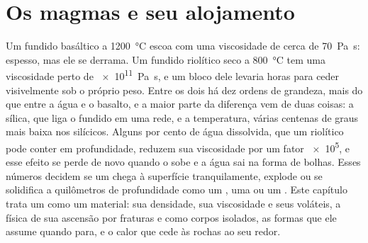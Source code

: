 \chapter{Os magmas e seu alojamento}\label{ch:b2:magma-emplacement}

Um fundido basáltico a \qty{1200}{\celsius} escoa com uma viscosidade de cerca de
\qty{70}{Pa.s}: espesso, mas ele se derrama. Um fundido riolítico seco a \qty{800}{\celsius}
tem uma viscosidade perto de \qty{e11}{Pa.s}, e um bloco dele levaria horas para ceder
visivelmente sob o próprio peso. Entre os dois há dez ordens de grandeza, mais
do que entre a água e o basalto, e a maior parte da diferença vem de duas
coisas: a sílica, que liga o fundido em uma rede, e a temperatura,
várias centenas de graus mais baixa nos  silícicos. Alguns por cento de
água dissolvida, que um  riolítico pode conter em profundidade, reduzem sua viscosidade
por um fator \num{e5}, e esse efeito se perde de novo quando o  sobe e a
água sai na forma de bolhas. Esses números decidem se um  chega à
superfície tranquilamente, explode ou se solidifica a quilômetros de profundidade como um , uma  ou um
. Este capítulo trata um  como um material: sua densidade, sua viscosidade e seus
voláteis, a física de sua ascensão por fraturas e como corpos isolados, as formas que ele
assume quando para, e o calor que cede às rochas ao seu redor.

